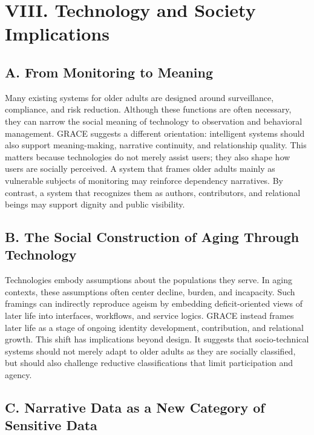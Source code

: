 \documentclass[
  journal,
]{IEEEtran}%
\begin{document}
\section{VIII. Technology and Society
Implications}\label{viii.-technology-and-society-implications}

\subsection{A. From Monitoring to
Meaning}\label{a.-from-monitoring-to-meaning}

Many existing systems for older adults are designed around surveillance,
compliance, and risk reduction. Although these functions are often
necessary, they can narrow the social meaning of technology to
observation and behavioral management. GRACE suggests a different
orientation: intelligent systems should also support meaning-making,
narrative continuity, and relationship quality. This matters because
technologies do not merely assist users; they also shape how users are
socially perceived. A system that frames older adults mainly as
vulnerable subjects of monitoring may reinforce dependency narratives.
By contrast, a system that recognizes them as authors, contributors, and
relational beings may support dignity and public visibility.

\subsection{B. The Social Construction of Aging Through
Technology}\label{b.-the-social-construction-of-aging-through-technology}

Technologies embody assumptions about the populations they serve. In
aging contexts, these assumptions often center decline, burden, and
incapacity. Such framings can indirectly reproduce ageism by embedding
deficit-oriented views of later life into interfaces, workflows, and
service logics. GRACE instead frames later life as a stage of ongoing
identity development, contribution, and relational growth. This shift
has implications beyond design. It suggests that socio-technical systems
should not merely adapt to older adults as they are socially classified,
but should also challenge reductive classifications that limit
participation and agency.

\subsection{C. Narrative Data as a New Category of Sensitive
Data}\label{c.-narrative-data-as-a-new-category-of-sensitive-data}
\end{document}
